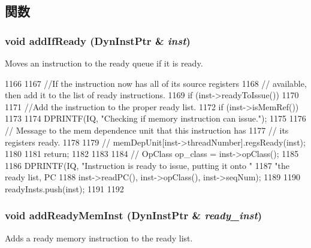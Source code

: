 \subsection{関数}
\hypertarget{classInstQueue_a7e3f1fa43ca939ed6fd9b3abcc47f06e}{
\subsubsection[{addIfReady}]{\setlength{\rightskip}{0pt plus 5cm}void addIfReady ({\bf DynInstPtr} \& {\em inst})}}
\label{classInstQueue_a7e3f1fa43ca939ed6fd9b3abcc47f06e}
Moves an instruction to the ready queue if it is ready. 


\begin{DoxyCode}
1166 {
1167     //If the instruction now has all of its source registers
1168     // available, then add it to the list of ready instructions.
1169     if (inst->readyToIssue()) {
1170 
1171         //Add the instruction to the proper ready list.
1172         if (inst->isMemRef()) {
1173 
1174             DPRINTF(IQ, "Checking if memory instruction can issue.\n");
1175 
1176             // Message to the mem dependence unit that this instruction has
1177             // its registers ready.
1178 
1179 //            memDepUnit[inst->threadNumber].regsReady(inst);
1180 
1181             return;
1182         }
1183 
1184 //        OpClass op_class = inst->opClass();
1185 
1186         DPRINTF(IQ, "Instruction is ready to issue, putting it onto "
1187                 "the ready list, PC %
1188                 inst->readPC(), inst->opClass(), inst->seqNum);
1189 
1190         readyInsts.push(inst);
1191     }
1192 }
\end{DoxyCode}
\hypertarget{classInstQueue_a76bcc078140b3e79923f7b5be8b302fb}{
\subsubsection[{addReadyMemInst}]{\setlength{\rightskip}{0pt plus 5cm}void addReadyMemInst ({\bf DynInstPtr} \& {\em ready\_\-inst})}}
\label{classInstQueue_a76bcc078140b3e79923f7b5be8b302fb}
Adds a ready memory instruction to the ready list. 


